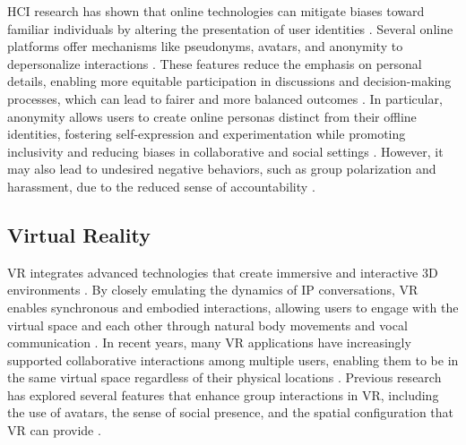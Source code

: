 HCI research has shown that online technologies can mitigate biases toward familiar individuals by altering the presentation of user identities \cite{maloney2020anonymity, Whiting2020, Tzlil2018}. Several online platforms offer mechanisms like pseudonyms, avatars, and anonymity to depersonalize interactions \cite{Shemla2016}. These features reduce the emphasis on personal details, enabling more equitable participation in discussions and decision-making processes, which can lead to fairer and more balanced outcomes \cite{christopherson2007positive, joinson2001self, walther1996computer}. In particular, anonymity allows users to create online personas distinct from their offline identities, fostering self-expression and experimentation while promoting inclusivity and reducing biases in collaborative and social settings \cite{bargh2002can, yurchisin2005exploration, kang2013people}. However, it may also lead to undesired negative behaviors, such as group polarization and harassment, due to the reduced sense of accountability \cite{weisband1993overcoming, Ma2016, christopherson2007positive}.

\subsection{Virtual Reality}
VR integrates advanced technologies that create immersive and interactive 3D environments \cite{wohlgenannt2020virtual, 10.1145/3613905.3651085, hubbard2024cross}. By closely emulating the dynamics of IP conversations, VR enables synchronous and embodied interactions, allowing users to engage with the virtual space and each other through natural body movements and vocal communication \cite{laato2024making, abbas2023virtual, mccloy2001science}. In recent years, many VR applications have increasingly supported collaborative interactions among multiple users, enabling them to be in the same virtual space regardless of their physical locations \cite{li2021social,10.1145/3411764.3445426}. Previous research has explored several features that enhance group interactions in VR, including the use of avatars, the sense of social presence, and the spatial configuration that VR can provide \cite{10.1145/3584931.3606992, sykownik2021most, fang2023towards}. 

